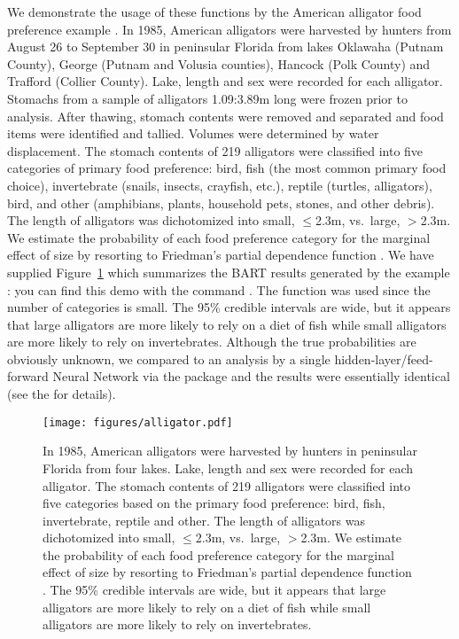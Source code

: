 \documentclass[article]{jss}
\begin{document}
We demonstrate the usage of these functions by the American alligator
food preference example \citep{DelaLind99,Agre03}. In 1985, American
alligators were harvested by hunters from August 26 to September 30 in
peninsular Florida from lakes Oklawaha (Putnam County), George (Putnam
and Volusia counties), Hancock (Polk County) and Trafford (Collier
County). Lake, length and sex were recorded for each
alligator. Stomachs from a sample of alligators 1.09:3.89m long were
frozen prior to analysis. After thawing, stomach contents were removed
and separated and food items were identified and tallied. Volumes were
determined by water displacement. The stomach contents of 219
alligators were classified into five categories of primary food
preference: bird, fish (the most common primary food choice),
invertebrate (snails, insects, crayfish, etc.), reptile (turtles,
alligators), bird, and other (amphibians, plants, household pets,
stones, and other debris).  The length of alligators was dichotomized
into small, $\le$2.3m, vs.\ large, $>$2.3m.  We estimate the
probability of each food preference category for the marginal effect
of size by resorting to Friedman's partial dependence function
\citep{Frie01}.  We have supplied Figure~\ref{alligator} which
summarizes the BART results generated by the example
: you can find this demo with the command
.  The
 function was used since the number of categories is
small.  The 95\% credible intervals are wide, but it appears that
large alligators are more likely to rely on a diet of fish while small
alligators are more likely to rely on invertebrates.  Although the
true probabilities are obviously unknown, we compared  to
an analysis by a single hidden-layer/feed-forward Neural Network via
the   package \citep{Ripl07,VenaRipl13} and the
results were essentially identical (see the  for details).
\begin{figure}%
\begin{center}
\texttt{[image: figures/alligator.pdf]}
\end{center}
\caption{\label{alligator}In 1985, American alligators were harvested
  by hunters in peninsular Florida from four lakes. Lake, length and
  sex were recorded for each alligator.  The stomach contents of 219
  alligators were classified into five categories based on the primary
  food preference: bird, fish, invertebrate, reptile and other.  The
  length of alligators was dichotomized into small, $\le$2.3m, vs.\
  large, $>$2.3m.  We estimate the probability of each food preference
  category for the marginal effect of size by resorting to Friedman's
  partial dependence function \citep{Frie01}.  The 95\% credible
  intervals are wide, but it appears that large alligators are more
  likely to rely on a diet of fish while small alligators are more
  likely to rely on invertebrates.  }
\end{figure}
\end{document}
